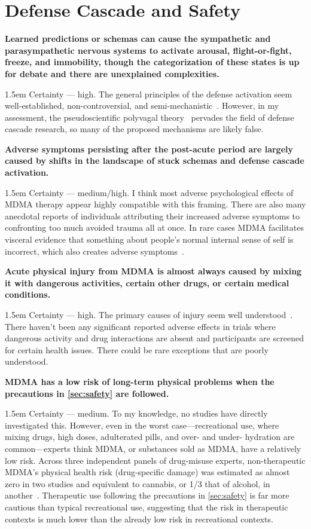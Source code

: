 \documentclass[11pt,oneside]{book}
\let\cite\parencite
\newcommand{\claim}[2]{%
    \par\medskip\noindent\textbf{#1}%
    \begin{adjustwidth}{1.5em}{}%
    \setlength{\parindent}{0pt}%
    \setlength{\parskip}{0.5\baselineskip}%
    #2%
    \end{adjustwidth}%
}
\begin{document}
\section*{Defense Cascade and Safety}
\claim{Learned predictions or schemas can cause the sympathetic and parasympathetic nervous systems to activate arousal, flight-or-fight, freeze, and immobility, though the categorization of these states is up for debate and there are unexplained complexities.}{Certainty --- high. The general principles of the defense activation seem well-established, non-controversial, and semi-mechanistic~\cite{kozlowskaDefenseCascade}. However, in my assessment, the pseudoscientific polyvagal theory~\cite{luckPolyvagal} pervades the field of defense cascade research, so many of the proposed mechanisms are likely false.}
\claim{Adverse symptoms persisting after the post-acute period are largely caused by shifts in the landscape of stuck schemas and defense cascade activation.}{Certainty --- medium/high. I think most adverse psychological effects of MDMA therapy appear highly compatible with this framing. There are also many anecdotal reports of individuals attributing their increased adverse symptoms to confronting too much avoided trauma all at once. In rare cases MDMA facilitates visceral evidence that something about people's normal internal sense of self is incorrect, which also creates adverse symptoms~\cite{ingramMDMA,ingram2018mastering}.}
\claim{Acute physical injury from MDMA is almost always caused by mixing it with dangerous activities, certain other drugs, or certain medical conditions.}{Certainty --- high. The primary causes of injury seem well understood~\cite{wolfgang2025,riggDeaths}. There haven't been any significant reported adverse effects in trials where dangerous activity and drug interactions are absent and participants are screened for certain health issues. There could be rare exceptions that are poorly understood.}
\claim{MDMA has a low risk of long-term physical problems when the precautions in \cref{sec:safety} are followed.}{Certainty --- medium. To my knowledge, no studies have directly investigated this. However, even in the worst case---recreational use, where mixing drugs, high doses, adulterated pills, and over- and under- hydration are common---experts think MDMA, or substances sold as MDMA, have a relatively low risk. Across three independent panels of drug-misuse experts, non-therapeutic MDMA's physical health risk (drug-specific damage) was estimated as almost zero in two studies and equivalent to cannabis, or 1/3 that of alcohol, in another~\cite{bonomoHarms,crossinHarms,nuttDrugHarms}. Therapeutic use following the precautions in \cref{sec:safety} is far more cautious than typical recreational use, suggesting that the risk in therapeutic contexts is much lower than the already low risk in recreational contexts.}
\end{document}

